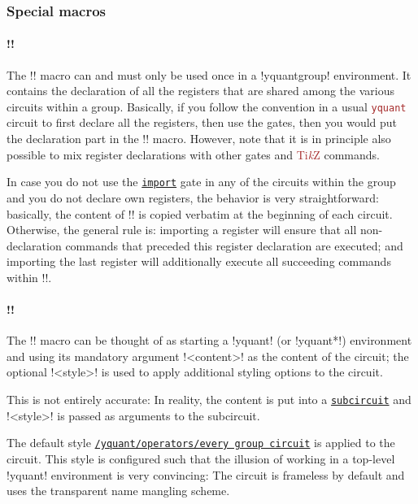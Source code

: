 \documentclass{scrartcl}
\def\TikZ{\textcolor{brown}{Ti\textit kZ}}
\def\pkg#1{\textcolor{brown}{\texttt{#1}}}
\def\gate#1{\hyperref[gate:#1]{\texttt{#1}}}
\def\style#1{\hyperref[style:#1]{\texttt{#1}}}
\def\Yquant{\pkg{yquant}}
\begin{document}
         \subsubsection{Special macros}
            \paragraph*{\tex!\registers!}
               The \tex!\registers! macro can and must only be used once in a \tex!yquantgroup! environment.
               It contains the declaration of all the registers that are shared among the various circuits within a group.
               Basically, if you follow the convention in a usual \Yquant{} circuit to first declare all the registers, then use the gates, then you would put the declaration part in the \tex!\registers! macro.
               However, note that it is in principle also possible to mix register declarations with other gates and \TikZ{} commands.

               In case you do not use the \gate{import} gate in any of the circuits within the group and you do not declare own registers, the behavior is very straightforward: basically, the content of \tex!\registers! is copied verbatim at the beginning of each circuit.
               Otherwise, the general rule is: importing a register will ensure that all non\hyp declaration commands that preceded this register declaration are executed; and importing the last register will additionally execute all succeeding commands within \tex!\registers!.

            \paragraph*{\tex!!}
               The \tex!\circuit! macro can be thought of as starting a \tex!yquant! (or \tex!yquant*!) environment and using its mandatory argument \tex!<content>! as the content of the circuit; the optional \tex!<style>! is used to apply additional styling options to the circuit.

               This is not entirely accurate: In reality, the content is put into a \gate{subcircuit} and \tex!<style>! is passed as arguments to the subcircuit.

               The default style \style{/yquant/operators/every group circuit} is applied to the circuit.
               This style is configured such that the illusion of working in a top\hyp level \tex!yquant! environment is very convincing: The circuit is frameless by default and uses the transparent name mangling scheme.
\end{document}
